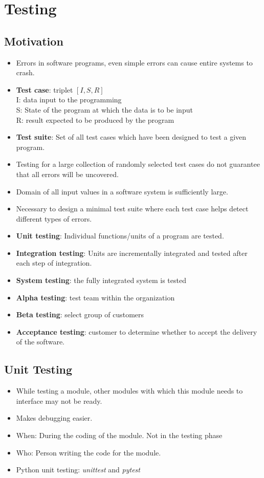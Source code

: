 \documentclass[a4paper]{article}
\begin{document}
\section{Testing}
\subsection{Motivation}
\begin{itemize}
    \item Errors in software programs, even simple errors can cause entire systems to crash.
    \item \textbf{Test case}: triplet $[I,S,R]$\\
    I: data input to the programming\\
    S: State of the program at which the data is to be input\\
    R: result expected to be produced by the program
    \item \textbf{Test suite}: Set of all test cases which have been designed to test a given program.
    \item Testing for a large collection of randomly selected test cases do not guarantee that all errors will be uncovered.
    \item Domain of all input values in a software system is sufficiently large.
    \item Necessary to design a minimal test suite where each test case helps detect different types of errors.
    \item \textbf{Unit testing}: Individual functions/units of a program are tested.
    \item \textbf{Integration testing}: Units are incrementally integrated and tested after each step of integration.
    \item \textbf{System testing}: the fully integrated system is tested
    \item \textbf{Alpha testing}: test team within the organization
    \item \textbf{Beta testing}: select group of customers
    \item \textbf{Acceptance testing}: customer to determine whether to accept the delivery of the software.
\end{itemize}

\subsection{Unit Testing}
\begin{itemize}
    \item While testing a module, other modules with which this module needs to interface may not be ready.
    \item Makes debugging easier.
    \item When: During the coding of the module. Not in the testing phase
    \item Who: Person writing the code for the module.
    \item Python unit testing: \textit{unittest} and \textit{pytest}
\end{itemize}
\end{document}
